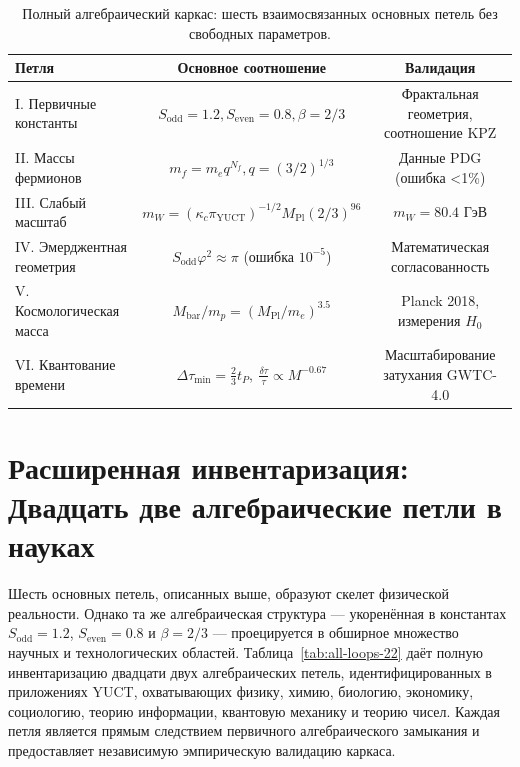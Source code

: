 \documentclass[12pt,a4paper]{article}
\begin{document}
	\begin{table}[htbp]
		\centering
		\caption{Полный алгебраический каркас: шесть взаимосвязанных основных петель без свободных параметров.}
		\label{tab:all-loops}
		\footnotesize
		\begin{tabular}{l c c}
			\toprule
			\textbf{Петля} & \textbf{Основное соотношение} & \textbf{Валидация} \\
			\midrule
			I. Первичные константы & \(S_{\mathrm{odd}}=1.2, S_{\mathrm{even}}=0.8, \beta=2/3\) & Фрактальная геометрия, соотношение KPZ \\
			II. Массы фермионов & \(m_f = m_e q^{N_f}, q=(3/2)^{1/3}\) & Данные PDG (ошибка <1\%) \\
			III. Слабый масштаб & \(m_W = (\kappa_c \pi_{\mathrm{YUCT}})^{-1/2} M_{\mathrm{Pl}} (2/3)^{96}\) & \(m_W = 80.4\) ГэВ \\
			IV. Эмерджентная геометрия & \(S_{\mathrm{odd}}\varphi^2 \approx \pi\) (ошибка \(10^{-5}\)) & Математическая согласованность \\
			V. Космологическая масса & \(M_{\mathrm{bar}}/m_p = (M_{\mathrm{Pl}}/m_e)^{3.5}\) & Planck 2018, измерения \(H_0\) \\
			VI. Квантование времени & \(\Delta \tau_{\min} = \frac{2}{3} t_P, \ \frac{\delta \tau}{\tau} \propto M^{-0.67}\) & Масштабирование затухания GWTC-4.0 \\
			\bottomrule
		\end{tabular}
	\end{table}
	
	\section*{Расширенная инвентаризация: Двадцать две алгебраические петли в науках}
	
	Шесть основных петель, описанных выше, образуют скелет физической реальности. Однако та же алгебраическая структура — укоренённая в константах \(S_{\mathrm{odd}} = 1.2\), \(S_{\mathrm{even}} = 0.8\) и \(\beta = 2/3\) — проецируется в обширное множество научных и технологических областей. Таблица~\ref{tab:all-loops-22} даёт полную инвентаризацию двадцати двух алгебраических петель, идентифицированных в приложениях YUCT, охватывающих физику, химию, биологию, экономику, социологию, теорию информации, квантовую механику и теорию чисел. Каждая петля является прямым следствием первичного алгебраического замыкания и предоставляет независимую эмпирическую валидацию каркаса.
	
\end{document}
